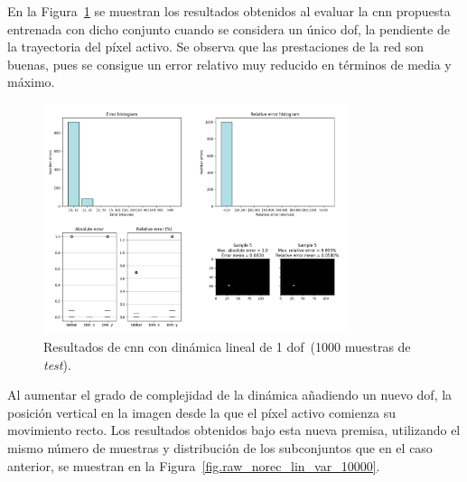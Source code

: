En la Figura~\ref{fig.raw_norec_lin_fix_10000} se muestran los resultados obtenidos al evaluar la \acrshort{cnn} propuesta entrenada con dicho conjunto cuando se considera un único \acrshort{dof}, la pendiente de la trayectoria del píxel activo. Se observa que las prestaciones de la red son buenas, pues se consigue un error relativo muy reducido en términos de media y máximo.

\begin{figure}[H]
		\begin{center}
			\includegraphics[width=0.8\textwidth]{ figures/test_raw/NOREC/linear_fix_10000.png}
			\caption{Resultados de \acrshort{cnn} con dinámica lineal de 1 \acrshort{dof}~(1000 muestras de \textit{test}).}
			\label{fig.raw_norec_lin_fix_10000}
		\end{center}
\end{figure}
\vspace{-10pt}


Al aumentar el grado de complejidad de la dinámica añadiendo un nuevo \acrshort{dof}, la posición vertical en la imagen desde la que el píxel activo comienza su movimiento recto. Los resultados obtenidos bajo esta nueva premisa, utilizando el mismo número de muestras y distribución de los subconjuntos que en el caso anterior, se muestran en la Figura~\ref{fig.raw_norec_lin_var_10000}.

